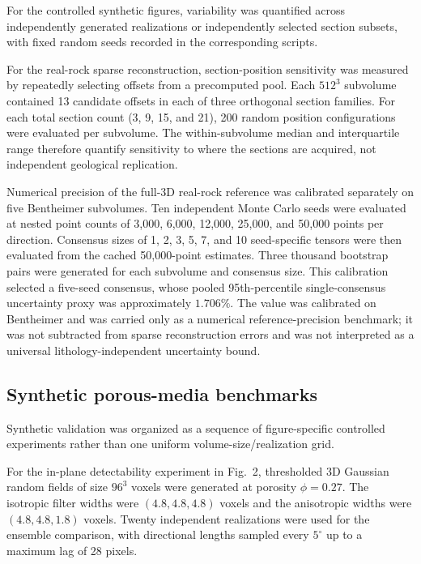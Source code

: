 \documentclass{article}
\begin{document}
For the controlled synthetic figures, variability was quantified across
independently generated realizations or independently selected section subsets,
with fixed random seeds recorded in the corresponding scripts.

For the real-rock sparse reconstruction, section-position sensitivity was
measured by repeatedly selecting offsets from a precomputed pool. Each
$512^3$ subvolume contained 13 candidate offsets in each of three orthogonal
section families. For each total section count (3, 9, 15, and 21), 200 random
position configurations were evaluated per subvolume. The within-subvolume
median and interquartile range therefore quantify sensitivity to where the
sections are acquired, not independent geological replication.

Numerical precision of the full-3D real-rock reference was calibrated
separately on five Bentheimer subvolumes. Ten independent Monte Carlo seeds
were evaluated at nested point counts of 3,000, 6,000, 12,000, 25,000, and
50,000 points per direction. Consensus sizes of 1, 2, 3, 5, 7, and 10
seed-specific tensors were then evaluated from the cached 50,000-point
estimates. Three thousand bootstrap pairs were generated for each subvolume
and consensus size. This calibration selected a five-seed consensus, whose
pooled 95th-percentile single-consensus uncertainty proxy was approximately
$1.706\%$. The value was calibrated on Bentheimer and was carried only as a
numerical reference-precision benchmark; it was not subtracted from sparse
reconstruction errors and was not interpreted as a universal
lithology-independent uncertainty bound.

\subsection{Synthetic porous-media benchmarks}
\label{subsec:synthetic_benchmarks}

Synthetic validation was organized as a sequence of figure-specific controlled
experiments rather than one uniform volume-size/realization grid.

For the in-plane detectability experiment in Fig.~2, thresholded 3D Gaussian
random fields of size $96^3$ voxels were generated at porosity $\phi=0.27$.
The isotropic filter widths were $(4.8,4.8,4.8)$ voxels and the anisotropic
widths were $(4.8,4.8,1.8)$ voxels. Twenty independent realizations were used
for the ensemble comparison, with directional lengths sampled every
$5^{\circ}$ up to a maximum lag of 28 pixels.
\end{document}
